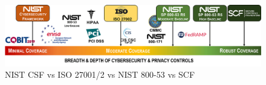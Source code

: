 
\begin{figure}[h!] 
\centering
\includegraphics[width=\textwidth]{./figures/fig3.png}
\caption{NIST CSF vs ISO 27001/2 vs NIST 800-53 vs SCF}
\label{fig:Fig6}
\end{figure}
